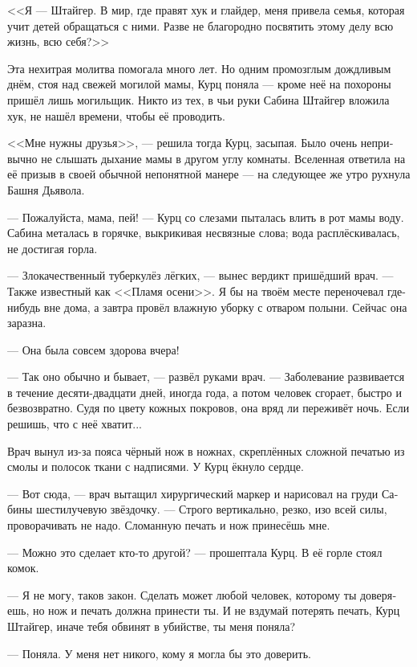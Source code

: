 \documentclass[a4paper,10pt,fleqn]{book}\usepackage{polyglossia}\setdefaultlanguage[babelshorthands=true]{russian}\setotherlanguage{english}\defaultfontfeatures{Ligatures=TeX,Mapping=tex-text}\usepackage{xcolor}\newcommand{\ml}[3]{#2}
\newcommand{\asterism}{\vspace{1em}{\centering\Large\bfseries$\ast~\ast~\ast$\par}\vspace{1em}}
\begin{document}
<<Я --- Штайгер.
В мир, где правят хук и глайдер, меня привела семья, которая учит детей обращаться с ними.
Разве не благородно посвятить этому делу всю жизнь, всю себя?>>

Эта нехитрая молитва помогала много лет.
Но одним промозглым дождливым днём, стоя над свежей могилой мамы, Курц поняла --- кроме неё на похороны пришёл лишь могильщик.
Никто из тех, в чьи руки Сабина Штайгер вложила хук, не нашёл времени, чтобы её проводить.

<<Мне нужны друзья>>, --- решила тогда Курц, засыпая.
Было очень непривычно не слышать дыхание мамы в другом углу комнаты.
Вселенная ответила на её призыв в своей обычной непонятной манере --- на следующее же утро рухнула Башня Дьявола.

\asterism

--- Пожалуйста, мама, пей! --- Курц со слезами пыталась влить в рот мамы воду.
Сабина металась в горячке, выкрикивая несвязные слова;
вода расплёскивалась, не достигая горла.

--- Злокачественный туберкулёз лёгких, --- вынес вердикт пришёдший врач.
--- Также известный как <<Пламя осени>>.
Я бы на твоём месте переночевал где-нибудь вне дома, а завтра провёл влажную уборку с отваром полыни.
Сейчас она заразна.

--- Она была совсем здорова вчера!

--- Так оно обычно и бывает, --- развёл руками врач.
--- Заболевание развивается в течение десяти-двадцати дней, иногда года, а потом человек сгорает, быстро и безвозвратно.
Судя по цвету кожных покровов, она вряд ли переживёт ночь.
Если решишь, что с неё хватит...

Врач вынул из-за пояса чёрный нож в ножнах, скреплённых сложной печатью из смолы и полосок ткани с надписями.
У Курц ёкнуло сердце.

--- Вот сюда, --- врач вытащил хирургический маркер и нарисовал на груди Сабины шестилучевую звёздочку.
--- Строго вертикально, резко, изо всей силы, проворачивать не надо.
Сломанную печать и нож принесёшь мне.

--- Можно это сделает кто-то другой? --- прошептала Курц.
В её горле стоял комок.

--- Я не могу, таков закон.
Сделать может любой человек, которому ты доверяешь, но нож и печать должна принести ты.
И не вздумай потерять печать, Курц Штайгер, иначе тебя обвинят в убийстве, ты меня поняла?

--- Поняла.
У меня нет никого, кому я могла бы это доверить.
\end{document}
